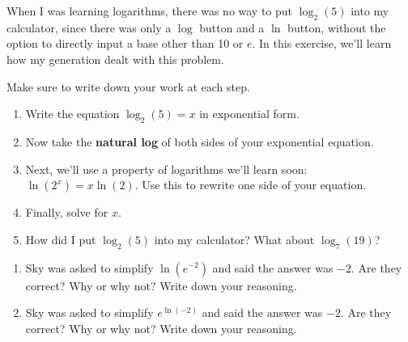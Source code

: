 \documentclass[noauthor,noinstructornotes]{ximera}
\begin{document}
\begin{problem}
When I was learning logarithms, there was no way to put \(\log_2(5)\)
into my calculator, since there was only a \(\log\) button and a
\(\ln\) button, without the option to directly input a base other
than 10 or \(e\). In this exercise, we'll learn how my generation
dealt with this problem.
 
Make sure to write down your work at each step.
 
\begin{enumerate}
    \item Write the equation \(\log_2(5) = x\) in exponential form.
    \item Now take the \textbf{natural log} of both sides of your
    exponential equation.
    \item Next, we'll use a property of logarithms we'll learn soon:
    \(\ln(2^x) = x \ln(2)\). Use this to rewrite one side of your equation.
    \item Finally, solve for \(x\).
    \item How did I put \(\log_2(5)\) into my calculator? What about
    \(\log_7(19)\)?
\end{enumerate}
\end{problem}
 
\begin{problem}
\begin{enumerate}
    \item Sky was asked to simplify \(\ln(e^{-2})\) and said the answer was
    \(-2\). Are they correct? Why or why not? Write down your reasoning.
    \item Sky was asked to simplify \(e^{\ln(-2)}\) and said the answer was
    \(-2\). Are they correct? Why or why not? Write down your reasoning.
\end{enumerate}
\end{problem}
 
\end{document}

